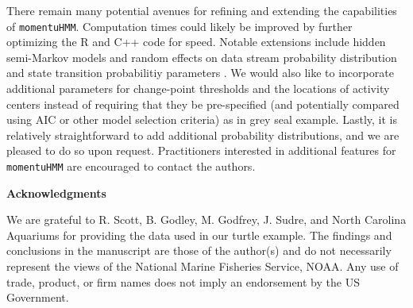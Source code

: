 \documentclass[12pt]{article}\usepackage[]{graphicx}\usepackage[]{color}
\begin{document}
There remain many potential avenues for refining and extending the capabilities of \verb|momentuHMM|. Computation times could likely be improved by further optimizing the R and C++ code for speed. Notable extensions include hidden semi-Markov models and random effects on data stream probability distribution and state transition probabilitiy parameters \citep{ZucchiniEtAl2016}. We would also like to incorporate additional parameters for change-point thresholds and the locations of activity centers instead of requiring that they be pre-specified (and potentially compared using AIC or other model selection criteria) as in grey seal example. Lastly, it is relatively straightforward to add additional probability distributions, and we are pleased to do so upon request. Practitioners interested in additional features for \verb|momentuHMM| are encouraged to contact the authors.

\noindent \textbf{Acknowledgments} 

\noindent We are grateful to R. Scott, B. Godley, M. Godfrey, J. Sudre, and North Carolina Aquariums for providing the data used in our turtle example. The findings and conclusions in the manuscript are those of the author(s) and do not necessarily represent the views of the National Marine Fisheries Service, NOAA. Any use of trade, product, or firm names does not imply an endorsement by the US Government.




\clearpage
\end{document}
